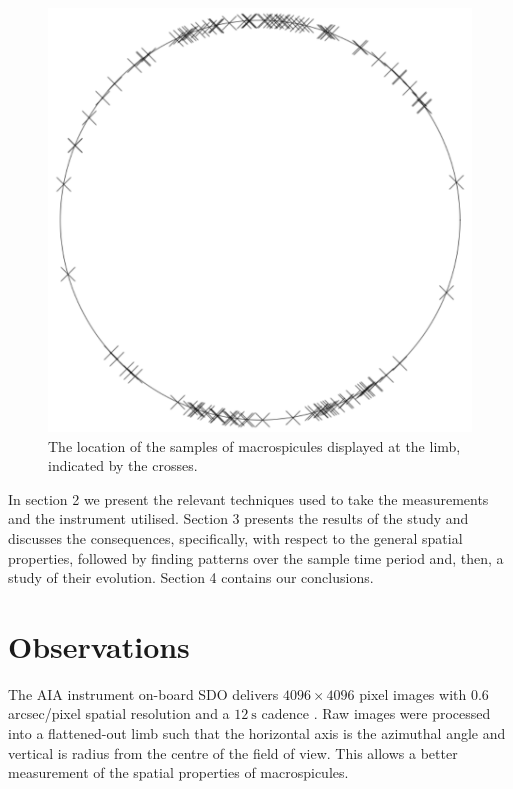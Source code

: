 \begin{figure}[h!]
	\centering
	\includegraphics[scale=0.3]{Figs/polar_demo.pdf}
	\caption{\small The location of the samples of macrospicules displayed at the limb, indicated by the crosses.}
	\label{fig:polar-sample}
\end{figure}


In section 2 we present the relevant techniques used to take the measurements and the instrument utilised. Section 3 presents the results of the study and discusses the consequences, specifically, with respect to the general spatial properties, followed by finding patterns over the sample time period and, then, a study of their evolution. Section 4 contains our conclusions.   


\section{Observations}    
The AIA instrument on-board SDO delivers $4096 \times 4096$ pixel images with $0.6$ arcsec/pixel spatial resolution and a $12\ \textrm{s}$ cadence \cite{AIAspec}. Raw images were processed into a flattened-out limb such that the horizontal axis is the azimuthal angle and vertical is radius from the centre of the field of view. This allows a better measurement of the spatial properties of macrospicules.


